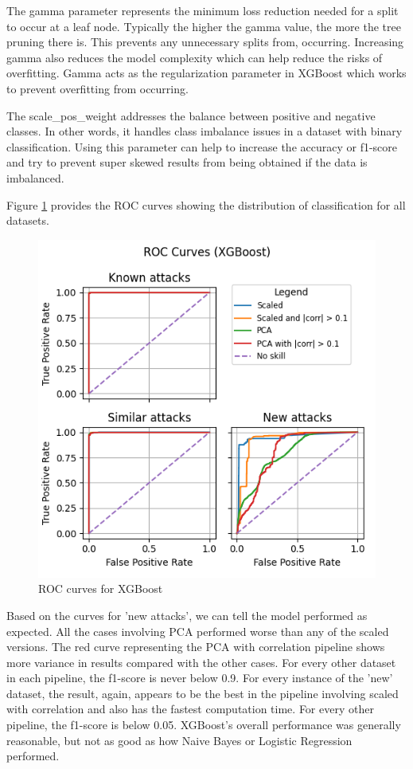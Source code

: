 The gamma parameter represents the minimum loss reduction needed for a split to occur at a leaf node. Typically the higher the gamma value, the more the tree pruning there is. This prevents any unnecessary splits from, occurring. Increasing gamma also reduces the model complexity which can help reduce the risks of overfitting. Gamma acts as the regularization parameter in XGBoost which works to prevent overfitting from occurring. 

The scale\_pos\_weight addresses the balance between positive and negative classes. In other words, it handles class imbalance issues in a dataset with binary classification. Using this parameter can help to increase the accuracy or f1-score and try to prevent super skewed results from being obtained if the data is imbalanced. 

Figure \ref{fig:xgboost_roc} provides the ROC curves showing the distribution of classification for all datasets.
\begin{figure}
    \centering
    \includegraphics[width=\linewidth]{figures/XGBoost_roc_all_small.png}
    \caption{ROC curves for XGBoost}
    \label{fig:xgboost_roc}
\end{figure}

Based on the curves for 'new attacks', we can tell the model performed as expected. All the cases involving PCA performed worse than any of the scaled versions. The red curve representing the PCA with correlation pipeline shows more variance in results compared with the other cases. For every other dataset in each pipeline, the f1-score is never below 0.9. For every instance of the 'new' dataset, the result, again, appears to be the best in the pipeline involving scaled with correlation and also has the fastest computation time. For every other pipeline, the f1-score is below 0.05. XGBoost's overall performance was generally reasonable, but not as good as how Naive Bayes or Logistic Regression performed. 

